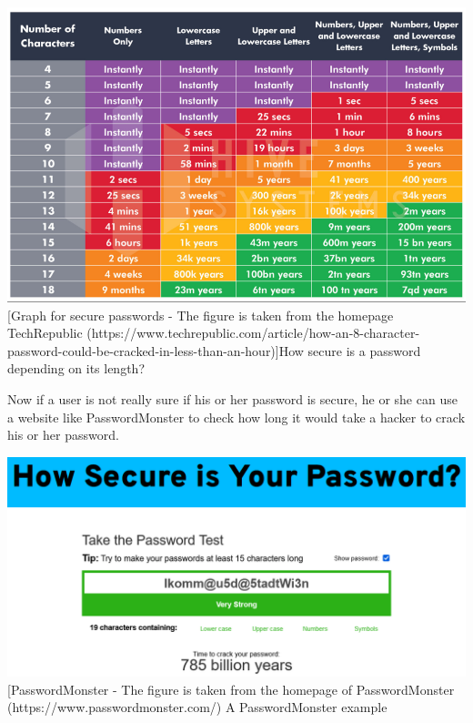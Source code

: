 \documentclass[conference]{IEEEtran}
\begin{document}
\begin{center}
\includegraphics[scale=0.335]{./images/brute_force.png}
[Graph for secure passwords - The figure is taken from the homepage TechRepublic (https://www.techrepublic.com/article/how-an-8-character-password-could-be-cracked-in-less-than-an-hour)]{How secure is a password depending on its length?}
\end{center}

Now if a user is not really sure if his or her password is secure, he or she can use a website like PasswordMonster to check how long it would take a hacker to crack his or her password.\cite{b9}

\begin{center}
\includegraphics[scale=0.38]{./images/PasswordMonster.png}
[PasswordMonster - The figure is taken from the homepage of PasswordMonster (https://www.passwordmonster.com/) {A PasswordMonster example}
\end{center}
\end{document}

